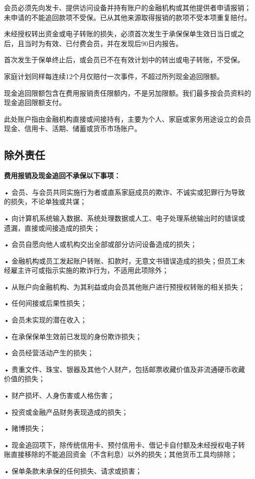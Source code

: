 \documentclass[UTF8,fontset=none,11pt,a4paper]{ctexart}
\begin{document}
会员必须先向发卡、提供访问设备并持有账户的金融机构或其他提供者申请报销；未申请的不能追回款项不受保。已从其他来源取得报销的款项不受本项重复赔付。


未经授权转出资金或电子转账的损失，必须首次发生于承保保单生效日当日或之后，且当时为有效、已付费会员，并在发现后90日内报告。


首次发生于保单终止后，或会员已不在有效计划中的转出或电子转账，不受保。


家庭计划同样每连续12个月仅赔付一次事件，不超过所列现金追回限额。


现金追回限额包含在费用报销责任限额内，不是另加限额。我们最多按会员资料的现金追回限额支付。


此处账户指由金融机构直接或间接持有，主要为个人、家庭或家务用途设立的会员现金、信用卡、活期、储蓄或货币市场账户。


\subsection*{除外责任}
\textbf{费用报销及现金追回不承保以下事项：}


• 会员、与会员共同实施行为者或直系家庭成员的欺诈、不诚实或犯罪行为导致的损失，不论单独或共谋；


• 向计算机系统输入数据、系统处理数据或人工、电子处理系统输出时的错误或遗漏，直接或间接造成的损失；


• 会员自愿向他人或机构交出全部或部分访问设备造成的损失；


• 金融机构或员工发起账户转账、扣款时，无意文书错误造成的损失；但员工未经雇主许可或指示实施的欺诈行为，不适用此项除外；


• 从账户向金融机构、为其利益或向会员其他账户进行预授权转账的相关损失；


• 任何间接或后果性损失；


• 会员未实现的潜在收入；


• 在承保保单生效前已发现的身份欺诈损失；


• 会员经营活动产生的损失；


• 贵重文件、珠宝、银器及其他个人财产，包括邮票收藏价值及非流通硬币收藏价值的损失；


• 财产损坏、人身伤害或人格伤害；


• 投资或金融产品财务表现造成的损失；


• 赌博损失；


• 现金追回项下，除传统信用卡、预付信用卡、借记卡自付额及未经授权电子转账直接移除的不能追回资金（不含利息）以外的损失；其他货币工具均排除；


• 保单条款未承保的任何损失、请求或损害；
\end{document}

